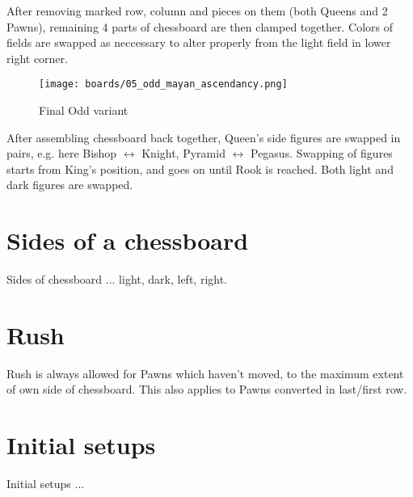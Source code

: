 After removing marked row, column and pieces on them (both Queens and
2 Pawns), remaining 4 parts of chessboard are then clamped together.
Colors of fields are swapped as neccessary to alter properly from the
light field in lower right corner.

\clearpage %

\noindent
\begin{figure}[!h]
\texttt{[image: boards/05\_odd\_mayan\_ascendancy.png]}
\caption{Final Odd variant}
\label{fig:05_odd_mayan_ascendancy}
\end{figure}

After assembling chessboard back together, Queen's side figures are swapped in
pairs, e.g. here Bishop $\leftrightarrow$ Knight, Pyramid $\leftrightarrow$ Pegasus.
Swapping of figures starts from King's position, and goes on until Rook is reached.
Both light and dark figures are swapped.

\clearpage %

\section*{Sides of a chessboard}
\label{sec:Definitions/Sides of a chessboard}

Sides of chessboard ... light, dark, left, right.

\section*{Rush}
\label{sec:Definitions/Rush}

Rush is always allowed for Pawns which haven't moved, to the maximum
extent of own side of chessboard. This also applies to Pawns converted
in last/first row.

\section*{Initial setups}
\label{sec:Definitions/Initial setups}
Initial setups ...


